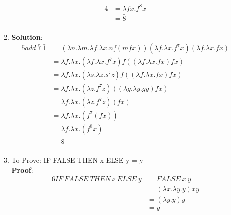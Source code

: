 \documentclass[11pt]{article}
\begin{document}
\begin{enumerate}
\begin{enumerate}
\begin{alignat*}{4}
&= \lambda fx.  f^8 x\\
&= \bar{8}\\
            \end{alignat*} 
    \item 
          \textbf{Solution}:  \begin{alignat*}{5}
                add\:\bar{7}\:\bar{1}  &= (\lambda n.\lambda m.\lambda f.\lambda x. n f (m f x))(\lambda f.\lambda x. f^7 x)(\lambda f.\lambda x. f x)\\
              &= \lambda f.\lambda x. (\lambda f.\lambda x. f^7 x) f ((\lambda f.\lambda x. f x)f x)\\
            &= \lambda f.\lambda x. (\lambda s.\lambda z. s^7 z) f ((\lambda f.\lambda x. f x)f x)\\
            &= \lambda f.\lambda x. (\lambda z. f^7 z)((\lambda g.\lambda y. g y)f x)\\
            &= \lambda f.\lambda x. (\lambda z. f^7 z)(f x)\\
            &= \lambda f.\lambda x. ( f^7 (f x))\\
            &= \lambda f.\lambda x. ( f^8 x)\\
                    &= \bar{8}\\
            \end{alignat*}
            
    \item To Prove: IF FALSE THEN x ELSE y = y\\
    \textbf{Proof}:  \begin{alignat*}{6}
    IF\:FALSE\:THEN\:x\:ELSE\:y &= FALSE\:x\:y  \\
    &= (\lambda x. \lambda y. y) x y\\
    &= ( \lambda y. y) y\\
    &= y\\
    \end{alignat*}
\end{enumerate}
\end{enumerate}
\end{document}
